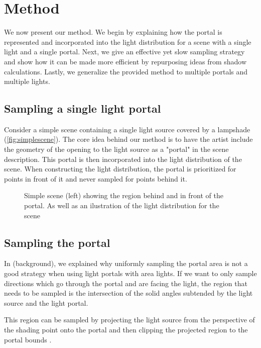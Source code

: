 \section{Method}
\label{sec:method}

We now present our method. We begin by explaining how the portal is represented and incorporated into the light distribution for a scene with a single light and a single portal. Next, we give an effective yet slow sampling strategy and show how it can be made more efficient by repurposing ideas from shadow calculations. Lastly, we generalize the provided method to multiple portals and multiple lights.

\subsection{Sampling a single light portal}

Consider a simple scene containing a single light source covered by a lampshade (\autoref{fig:simplescene}). The core idea behind our method is to have the artist include the geometry of the opening to the light source as a "portal" in the scene description. This portal is then incorporated into the light distribution of the scene. When constructing the light distribution, the portal is prioritized for points in front of it and never sampled for points behind it.

\begin{figure}[H]
  \def\svgwidth{0.9\columnwidth}
  
  \caption{Simple scene (left) showing the region behind and in front of the portal. As well as an ilustration of the light distribution for the scene}
  \label{fig:simplescene}
\end{figure}

\subsection{Sampling the portal}
\label{sec:proj-sampling}

In  (background), we explained why uniformly sampling the portal area is not a good strategy when using light portals with area lights. If we want to only sample directions which go through the portal and are facing the light, the region that needs to be sampled is the intersection of the solid angles subtended by the light source and the light portal. 

This region can be sampled by projecting the light source from the perspective of the shading point onto the portal and then clipping the projected region to the portal bounds \cite{sutherlandReentrantPolygonClipping1974}.

